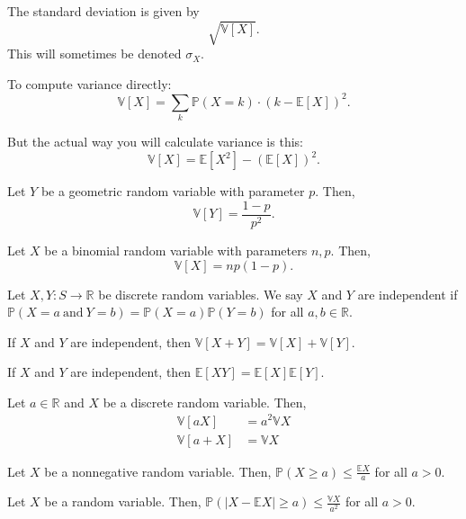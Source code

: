 \documentclass{article}
\begin{document}
    The standard deviation is given by $$\sqrt{\mathbb V[X]}.$$ This will sometimes be denoted $\sigma_X$.
    
    To compute variance directly: $$\mathbb V[X] = \sum_k \mathbb P(X = k) \cdot (k - \mathbb E[X])^2.$$
    
    But the actual way you will calculate variance is this: $$\mathbb V[X] = \mathbb E[X^2] - (\mathbb E[X])^2.$$
    
\medskip
{}

    Let $Y$ be a geometric random variable with parameter $p$. Then, $$\mathbb V[Y] = \frac{1-p}{p^2}.$$
    
\medskip
{}

    Let $X$ be a binomial random variable with parameters $n, p$. Then, $$\mathbb V[X] = np(1-p).$$
    
\medskip
{}

    Let $X,Y: S \to \mathbb R$ be discrete random variables. We say $X$ and $Y$ are independent if $\mathbb P(X=a~\text{and}~Y=b) = \mathbb P(X=a) \mathbb P(Y = b)$ for all $a,b \in \mathbb R$.
    
\medskip
{}

    If $X$ and $Y$ are independent, then $\mathbb V[X+Y]=\mathbb V[X] + \mathbb V[Y]$.
    
\medskip
{}

    If $X$ and $Y$ are independent, then $\mathbb E[XY] = \mathbb E[X] \mathbb E[Y]$.
    
\medskip
{}

    Let $a \in \mathbb R$ and $X$ be a discrete random variable. Then, \begin{align*}
        \mathbb V[aX]    &= a^2\mathbb VX \\
        \mathbb V[a + X] &= \mathbb VX
    \end{align*}
    
\medskip
{}

    Let $X$ be a nonnegative random variable. Then, $\mathbb P(X \geq a) \leq \frac{\mathbb EX}{a}$ for all $a > 0$.
    
\medskip
{}

    Let $X$ be a         random variable. Then, $\mathbb P(|X - \mathbb EX| \geq a) \leq \frac{\mathbb VX}{a^2}$ for all $a > 0$.
    
\end{document}
